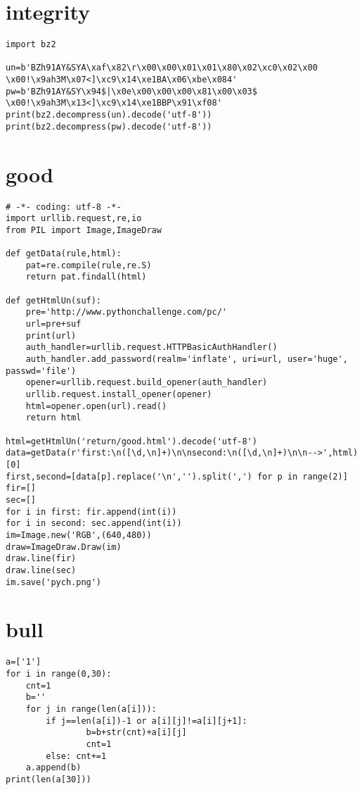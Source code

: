 \documentclass[onecolumn,a4paper,12pt]{article}
\begin{document}
\section{integrity}
\begin{lstlisting}
import bz2

un=b'BZh91AY&SYA\xaf\x82\r\x00\x00\x01\x01\x80\x02\xc0\x02\x00 \x00!\x9ah3M\x07<]\xc9\x14\xe1BA\x06\xbe\x084'
pw=b'BZh91AY&SY\x94$|\x0e\x00\x00\x00\x81\x00\x03$ \x00!\x9ah3M\x13<]\xc9\x14\xe1BBP\x91\xf08'
print(bz2.decompress(un).decode('utf-8'))
print(bz2.decompress(pw).decode('utf-8'))
\end{lstlisting}

\section{good}
\begin{lstlisting}
# -*- coding: utf-8 -*-
import urllib.request,re,io
from PIL import Image,ImageDraw

def getData(rule,html):
    pat=re.compile(rule,re.S)
    return pat.findall(html)

def getHtmlUn(suf):
    pre='http://www.pythonchallenge.com/pc/'
    url=pre+suf
    print(url)
    auth_handler=urllib.request.HTTPBasicAuthHandler()
    auth_handler.add_password(realm='inflate', uri=url, user='huge', passwd='file')
    opener=urllib.request.build_opener(auth_handler)
    urllib.request.install_opener(opener)
    html=opener.open(url).read()
    return html

html=getHtmlUn('return/good.html').decode('utf-8')
data=getData(r'first:\n([\d,\n]+)\n\nsecond:\n([\d,\n]+)\n\n-->',html)[0]
first,second=[data[p].replace('\n','').split(',') for p in range(2)]
fir=[]
sec=[]
for i in first: fir.append(int(i))
for i in second: sec.append(int(i))
im=Image.new('RGB',(640,480))
draw=ImageDraw.Draw(im)
draw.line(fir)
draw.line(sec)
im.save('pych.png')
\end{lstlisting}

\section{bull}
\begin{lstlisting}
a=['1']
for i in range(0,30):
    cnt=1
    b=''
    for j in range(len(a[i])):
        if j==len(a[i])-1 or a[i][j]!=a[i][j+1]:
                b=b+str(cnt)+a[i][j]
                cnt=1
        else: cnt+=1
    a.append(b)
print(len(a[30]))
\end{lstlisting}
\end{document}
